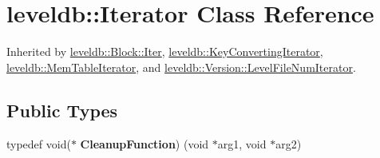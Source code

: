 \hypertarget{classleveldb_1_1_iterator}{}\section{leveldb\+::Iterator Class Reference}
\label{classleveldb_1_1_iterator}


Inherited by \mbox{\hyperlink{classleveldb_1_1_block_1_1_iter}{leveldb\+::\+Block\+::\+Iter}}, \mbox{\hyperlink{classleveldb_1_1_key_converting_iterator}{leveldb\+::\+Key\+Converting\+Iterator}}, \mbox{\hyperlink{classleveldb_1_1_mem_table_iterator}{leveldb\+::\+Mem\+Table\+Iterator}}, and \mbox{\hyperlink{classleveldb_1_1_version_1_1_level_file_num_iterator}{leveldb\+::\+Version\+::\+Level\+File\+Num\+Iterator}}.

\subsection*{Public Types}
\begin{DoxyCompactItemize}
\item 
\mbox{\label{classleveldb_1_1_iterator_ae40c9eedd82a722d24fde1fd8bee4afa}} 
typedef void($\ast$ {\bfseries Cleanup\+Function}) (void $\ast$arg1, void $\ast$arg2)
\end{DoxyCompactItemize}
